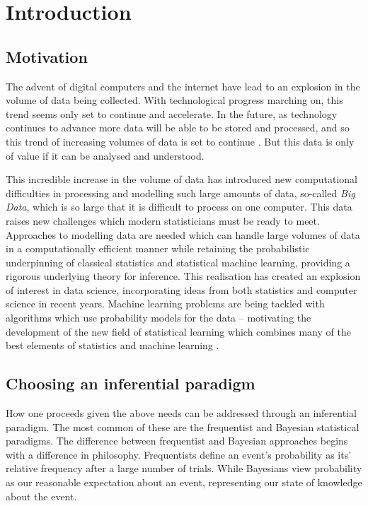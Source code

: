 \chapter{Introduction}

\section{Motivation}

The advent of digital computers and the internet have lead to an explosion in
the volume of data being collected. With technological progress marching on,
this trend seems only set to continue and accelerate. In the future, as
technology continues to advance more data will be able to be stored and
processed, and so this trend of increasing volumes of data is set to continue
\citep{Gandomi2015}. But this data is only of value if it can be analysed and
understood.

This incredible increase in the volume of data has introduced new computational
difficulties in processing and modelling such large amounts of data, so-called
\emph{Big Data}, which is so large that it is difficult to process on one
computer. This data raises new challenges which modern statisticians must be
ready to meet. Approaches to modelling data are needed which can handle large
volumes of data in a computationally efficient manner while retaining the
probabilistic underpinning of classical statistics and statistical machine
learning, providing a rigorous underlying theory for inference. This realisation
has created an explosion of interest in data science, incorporating ideas from
both statistics and computer science in recent years. Machine learning problems
are being tackled with algorithms which use probability models for the data --
motivating the development of the new field of statistical learning which
combines many of the best elements of statistics and machine learning
\citep{James:2014:ISL:2517747, MacKay:2002:ITI:971143,
hastie01statisticallearning, Murphy:2012:MLP:2380985}.

\section{Choosing an inferential paradigm}

How one proceeds given the above needs can be addressed through an inferential
paradigm. The most common of these are  the frequentist and Bayesian statistical
paradigms. The difference between frequentist and Bayesian approaches begins
with a difference in philosophy. Frequentists define an event's probability as
its' relative frequency after a large number of trials. While Bayesians view
probability as our reasonable expectation about an event, representing our state
of knowledge about the event.

